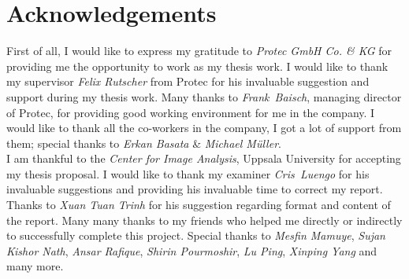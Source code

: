 \chapter*{Acknowledgements}
First of all, I would like to express my gratitude to \textit{Protec GmbH Co. \& KG} for providing me the opportunity to work as my thesis work. I would like to thank my supervisor \emph{Felix Rutscher} from Protec for his invaluable suggestion and support during my thesis work. Many thanks to \emph{Frank~Baisch}, managing director of Protec, for providing good working environment for me in the company. I would like to thank all the co-workers in the company, I got a lot of support from them; special thanks to \emph{Erkan Basata} \& \emph{Michael M\"uller}.\\

\noindent I am thankful to the \emph{Center for Image Analysis}, Uppsala University for accepting my thesis proposal. I would like to thank my examiner \emph{\mbox{Cris Luengo}} for his invaluable suggestions and providing his invaluable time to correct my report. Thanks to \emph{Xuan Tuan Trinh} for his suggestion regarding format and content of the report. Many many thanks to my friends who helped me directly or indirectly to successfully complete this project. Special thanks to \emph{Mesfin Mamuye}, \emph{Sujan Kishor Nath}, \emph{Ansar Rafique}, \emph{Shirin Pourmoshir}, \emph{Lu Ping}, \emph{Xinping Yang} and many more.



